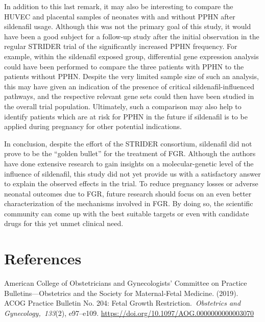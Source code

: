 \documentclass[authordate, reflection,issue]{jote-new-article}
\begin{document}
	In addition to this last remark, it may also be interesting to compare the HUVEC and placental samples of neonates with and without PPHN after sildenafil usage. Although this was not the primary goal of this study, it would have been a good subject for a follow-up study after the initial observation in the regular STRIDER trial of the significantly increased PPHN frequency. For example, within the sildenafil exposed group, differential gene expression analysis could have been performed to compare the three patients with PPHN to the patients without PPHN. Despite the very limited sample size of such an analysis, this may have given an indication of the presence of critical sildenafil-influenced pathways, and the respective relevant gene sets could then have been studied in the overall trial population. Ultimately, such a comparison may also help to identify patients which are at risk for PPHN in the future if sildenafil is to be applied during pregnancy for other potential indications.



	In conclusion, despite the effort of the STRIDER consortium, sildenafil did not prove to be the “golden bullet” for the treatment of FGR. Although the authors have done extensive research to gain insights on a molecular-genetic level of the influence of sildenafil, this study did not yet provide us with a satisfactory answer to explain the observed effects in the trial. To reduce pregnancy losses or adverse neonatal outcomes due to FGR, future research should focus on an even better characterization of the mechanisms involved in FGR. By doing so, the scientific community can come up with the best suitable targets or even with candidate drugs for this yet unmet clinical need.











	\section{References}



	American College of Obstetricians and Gynecologists' Committee on Practice Bulletins—Obstetrics and the Society for Maternal-Fetal Medicine. (2019). ACOG Practice Bulletin No. 204: Fetal Growth Restriction. \emph{Obstetrics and Gynecology, 133}(2), e97--e109. \url{https://doi.org/10.1097/AOG.0000000000003070}
\end{document}
